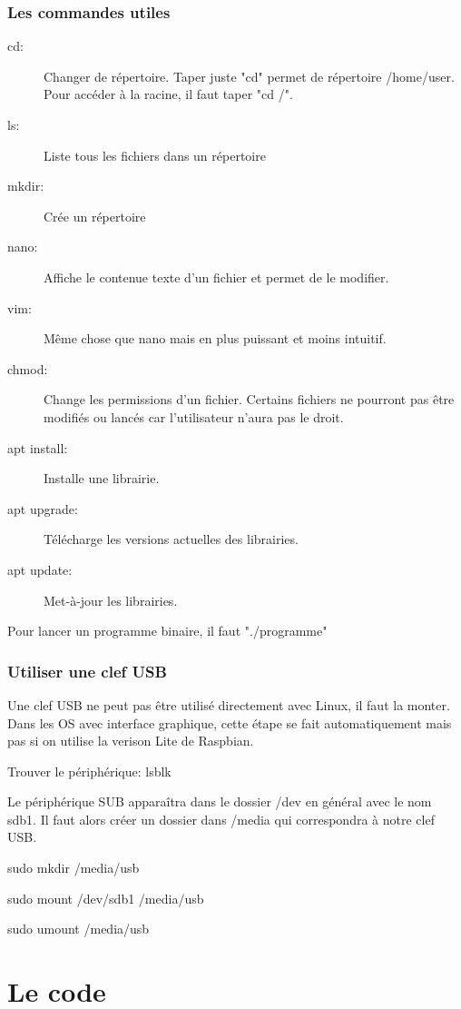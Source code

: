\documentclass[a4paper, 11pt]{report}
\begin{document}
\subsection{Les commandes utiles}
\begin{description}
\item[cd:] Changer de répertoire. Taper juste "cd" permet de répertoire /home/user. Pour accéder à la racine, il faut taper "cd /".
\item[ls:] Liste tous les fichiers dans un répertoire
\item[mkdir:] Crée un répertoire
\item[nano:] Affiche le contenue texte d'un fichier et permet de le modifier.
\item[vim:] Même chose que nano mais en plus puissant et moins intuitif.
\item[chmod:] Change les permissions d'un fichier. Certains fichiers ne pourront pas être modifiés ou lancés car l'utilisateur n'aura pas le droit.
\item[apt install:] Installe une librairie.
\item[apt upgrade:] Télécharge les versions actuelles des librairies.
\item[apt update:] Met-à-jour les librairies.
\end{description}

Pour lancer un programme binaire, il faut "./programme"

\subsection{Utiliser une clef USB}
Une clef USB ne peut pas être utilisé directement avec Linux, il faut la monter. Dans les OS avec interface graphique, cette étape se fait automatiquement mais pas si on utilise la verison Lite de Raspbian.

Trouver le périphérique:
lsblk

Le périphérique SUB apparaîtra dans le dossier /dev en général avec le nom sdb1. Il faut alors créer un dossier dans /media qui correspondra à notre clef USB.

sudo  mkdir /media/usb 

sudo mount /dev/sdb1 /media/usb

sudo umount /media/usb

\chapter{Le code}
\end{document}
